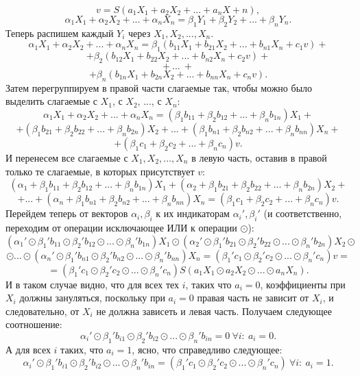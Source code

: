 \documentclass[a4paper,12pt]{report}
\theoremstyle{plain} %
\theoremstyle{definition}
\theoremstyle{remark}
\begin{document}
\begin{large}
$$v = S(a_1X_1 + a_2X_2 + ... + a_nX+n),$$
$$\alpha_1X_1 + \alpha_2X_2 + ... + \alpha_nX_n = \beta_1Y_1 + \beta_2Y_2 + ... + \beta_nY_n. $$
Теперь распишем каждый $Y_i$ через $X_1, X_2, ..., X_n$.
$$\alpha_1X_1 + \alpha_2X_2 + ... + \alpha_nX_n = \beta_1(b_{11}X_1 + b_{21}X_2 + ... + b_{n1}X_n + c_1v) +$$
$$ +  \beta_2(b_{12}X_1 + b_{22}X_2 + ... + b_{n2}X_n + c_2v) +$$
$$+~ ...~ +$$
$$+ \beta_n(b_{1n}X_1 + b_{2n}X_2 + ... + b_{nn}X_n + c_nv). $$
Затем перегруппируем в правой части слагаемые так, чтобы можно было выделить слагаемые с $X_1$, с $X_2$, ..., с $X_n$:
$$\alpha_1X_1 + \alpha_2X_2 + ... + \alpha_nX_n = (\beta_1b_{11} + \beta_2b_{12} + ... + \beta_nb_{1n})X_1 + $$
$$+(\beta_1b_{21} + \beta_2b_{22} + ... + \beta_nb_{2n})X_2 + ... + (\beta_1b_{n1} + \beta_2b_{n2} + ... + \beta_nb_{nn})X_n+$$
$$+ (\beta_1c_1 + \beta_2c_2 + ... + \beta_nc_n)v.$$
И перенесем все слагаемые с $X_1, X_2, ..., X_n$ в левую часть, оставив в правой только те слагаемые, в которых присутствует $v$:
$$ (\alpha_1 + \beta_1b_{11} + \beta_2b_{12} + ... + \beta_nb_{1n})X_1 + (\alpha_2 + \beta_1b_{21} + \beta_2b_{22} + ... + \beta_nb_{2n})X_2 + $$
$$+...+ (\alpha_n + \beta_1b_{n1} + \beta_2b_{n2} + ... + \beta_nb_{nn})X_n =  (\beta_1c_1 + \beta_2c_2 + ... + \beta_nc_n)v.$$
Перейдем теперь от векторов $\alpha_i, \beta_i$ к их индикаторам $\alpha_i', \beta_i'$ (и соответственно, переходим от операции исключающее ИЛИ к операции $\odot$):
$$ (\alpha_1' \odot \beta_1'b_{11} \odot \beta_2'b_{12} \odot ... \odot \beta_n'b_{1n})X_1 \odot (\alpha_2' \odot \beta_1'b_{21} \odot \beta_2'b_{22} \odot ... \odot \beta_n'b_{2n})X_2 \odot $$
$$\odot...\odot (\alpha_n' \odot \beta_1'b_{n1} \odot \beta_2'b_{n2} \odot ... \odot \beta_n'b_{nn})X_n =  (\beta_1'c_1 \odot \beta_2'c_2 \odot ... \odot \beta_n'c_n)v = $$
\begin{equation}\label{eq:not_final_lin}=(\beta_1'c_1 \odot \beta_2'c_2 \odot ... \odot \beta_n'c_n)S(a_1X_1 \odot a_2X_2 \odot ... \odot a_nX_n).\end{equation}
И в таком случае видно, что для всех тех $i$, таких что $a_i = 0$, коэффициенты при $X_i$ должны зануляться, поскольку при $a_i = 0$ правая часть не зависит от $X_i$, и следовательно, от $X_i$ не должна зависеть и левая часть. Получаем следующее соотношение: 
$$\alpha_i' \odot \beta_1'b_{i1} \odot \beta_2'b_{i2} \odot ... \odot \beta_n'b_{in} = 0 ~ \forall i: ~a_i = 0.$$
А для всех $i$ таких, что $a_i = 1$, ясно, что справедливо следующее:
$$\alpha_i' \odot \beta_1'b_{i1} \odot \beta_2'b_{i2} \odot ... \odot \beta_n'b_{in} = (\beta_1'c_1 \odot \beta_2'c_2 \odot ... \odot \beta_n'c_n) ~ \forall i: ~a_i = 1.$$

\end{large}
\end{document}
